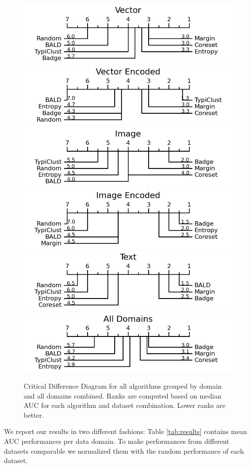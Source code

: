 \documentclass[]{article}
\begin{document}
%
\begin{figure}
\centering
	\includegraphics[width=0.49\linewidth]{img/macro_vector}
	\includegraphics[width=0.49\linewidth]{img/macro_vector_enc}
	\includegraphics[width=0.49\linewidth]{img/macro_img}
	\includegraphics[width=0.49\linewidth]{img/macro_img_enc}
	\includegraphics[width=0.49\linewidth]{img/macro_text}
	\includegraphics[width=0.49\linewidth]{img/macro_all.jpg}
	\caption{Critical Difference Diagram for all algorithms grouped by domain and all domains combined. Ranks are computed based on median AUC for each algorithm and dataset combination. Lower ranks are better.}
	\label{fig:cd_diagrams}
\end{figure}
%
We report our results in two different fashions: Table \ref{tab:results} contains mean AUC performances per data domain.
To make performances from different datasets comparable we normalized them with the random performance of each dataset.
\end{document}
